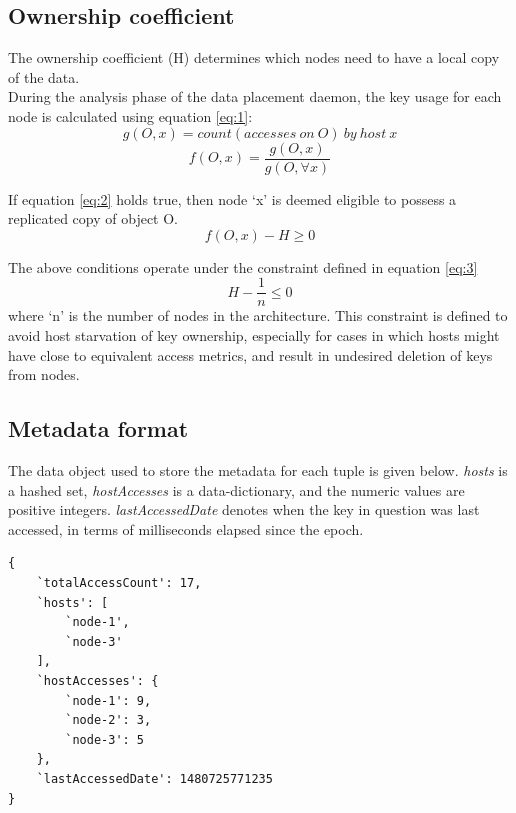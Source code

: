 \documentclass{sig-alternate}
\begin{document}
\subsection{Ownership coefficient}
The ownership coefficient (H) determines which nodes need to have a local copy of the data.\\

During the analysis phase of the data placement daemon, the key usage for each node is calculated using equation \ref{eq:1}:
\begin{equation*}g(O, x) = count(accesses\ on\ O)\ by\ host\ x \end{equation*}
\begin{equation} \label{eq:1} f(O,x) = \frac{g(O, x)}{g(O, \forall x)} \end{equation}

If equation \ref{eq:2} holds true, then node `x' is deemed eligible to possess a replicated copy of object O.
\begin{equation} \label{eq:2} f(O, x) - H \geq 0 \end{equation}

The above conditions operate under the constraint defined in equation \ref{eq:3}
\begin{equation} \label{eq:3} H - \frac{1}{n} \leq 0 \end{equation}
where `n' is the number of nodes in the architecture. This constraint is defined to avoid host starvation of key ownership, especially for cases in which hosts might have close to equivalent access metrics, and result in undesired deletion of keys from nodes.\\


\subsection{Metadata format}
The data object used to store the metadata for each tuple is given below. \textit{hosts} is a hashed set, \textit{hostAccesses} is a data-dictionary, and the numeric values are positive integers. \textit{lastAccessedDate} denotes when the key in question was last accessed, in terms of milliseconds elapsed since the epoch.\\
\begin{lstlisting}
{
    `totalAccessCount': 17,
    `hosts': [
        `node-1',
        `node-3'
    ],
    `hostAccesses': {
        `node-1': 9,
        `node-2': 3,
        `node-3': 5
    },
    `lastAccessedDate': 1480725771235
}
\end{lstlisting}
\end{document}
